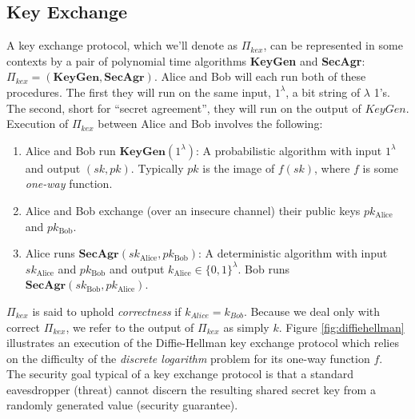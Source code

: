 \subsection{Key Exchange}

A key exchange protocol, which we'll denote as $\Pi_{kex}$, can be represented in some contexts by a pair of polynomial time algorithms \textbf{KeyGen} and \textbf{SecAgr}: $\Pi_{kex} = (\textbf{KeyGen},\textbf{SecAgr})$. Alice and Bob will each run both of these procedures. The first they will run on the same input, $1^\lambda$, a bit string of $\lambda$ 1's. The second, short for ``secret agreement'', they will run on the output of $KeyGen$.\\

Execution of $\Pi_{kex}$ between Alice and Bob involves the following:
\begin{enumerate}[label=(\roman*)]
\item Alice and Bob run $\textbf{KeyGen}(1^\lambda)$: A probabilistic algorithm with input $1^\lambda$ and output $(sk,pk)$. Typically $pk$ is the image of $f(sk)$, where $f$ is some \emph{one-way} function.
\item Alice and Bob exchange (over an insecure channel) their public keys $pk_{\text{Alice}}$ and $pk_{\text{Bob}}$.
\item Alice runs $\textbf{SecAgr}(sk_{\text{Alice}}, pk_{\text{Bob}})$: A deterministic algorithm with input $sk_{\text{Alice}}$ and $pk_{\text{Bob}}$ and output $k_{\text{Alice}} \in \{0,1\}^\lambda$. Bob runs $\textbf{SecAgr}(sk_{\text{Bob}}, pk_{\text{Alice}})$.
\end{enumerate}

$\Pi_{kex}$ is said to uphold \emph{correctness} if $k_{Alice} = k_{Bob}$. Because we deal only with correct $\Pi_{kex}$, we refer to the output of $\Pi_{kex}$ as simply $k$. Figure \ref{fig:diffiehellman} illustrates an execution of the Diffie-Hellman key exchange protocol which relies on the difficulty of the \emph{discrete logarithm} problem for its one-way function $f$.\\

The security goal typical of a key exchange protocol is that a standard eavesdropper (threat) cannot discern the resulting shared secret key from a randomly generated value (security guarantee).


